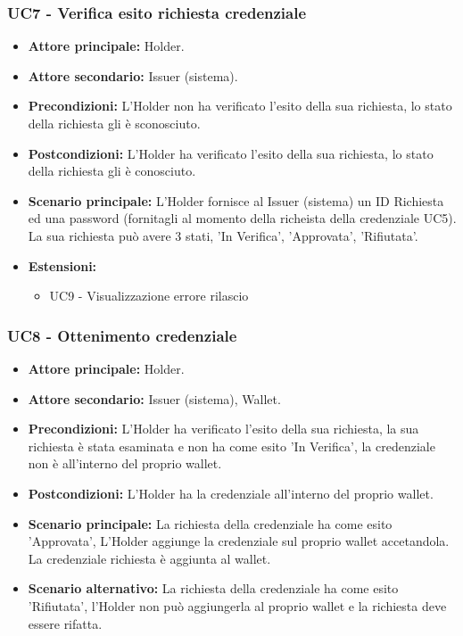 \subsubsection{UC7 - Verifica esito richiesta credenziale} 
\begin{itemize}
    \item \textbf{Attore principale:} Holder.
    \item \textbf{Attore secondario:} Issuer (sistema).
    \item \textbf{Precondizioni:} L'Holder non ha verificato l'esito della sua richiesta, lo stato della richiesta gli è sconosciuto.
    \item \textbf{Postcondizioni:} L'Holder ha verificato l'esito della sua richiesta, lo stato della richiesta gli è conosciuto.
    \item \textbf{Scenario principale:} L’Holder fornisce al Issuer (sistema) un ID Richiesta ed una password (fornitagli al momento della richeista della credenziale UC5).\\
    La sua richiesta può avere 3 stati, 'In Verifica', 'Approvata', 'Rifiutata'.
    \item \textbf{Estensioni:}
    \begin{itemize}
    \item  UC9 - Visualizzazione errore rilascio
    \end{itemize}
\end{itemize}

\subsubsection{UC8 - Ottenimento credenziale}
\begin{itemize}
    \item \textbf{Attore principale:} Holder.
    \item \textbf{Attore secondario:} Issuer (sistema), Wallet.
    \item \textbf{Precondizioni:} L'Holder ha verificato l'esito della sua richiesta, la sua richiesta è stata esaminata e non ha come esito 'In Verifica', la credenziale non è all'interno del proprio wallet.
    \item \textbf{Postcondizioni:} L'Holder ha la credenziale all'interno del proprio wallet.
    \item \textbf{Scenario principale:} La richiesta della credenziale ha come esito 'Approvata',
    L’Holder aggiunge la credenziale sul proprio wallet accetandola.\\
    La credenziale richiesta è aggiunta al wallet.
    \item \textbf{Scenario alternativo:} La richiesta della credenziale ha come esito 'Rifiutata', l'Holder non può aggiungerla al proprio wallet e la richiesta deve essere rifatta.
\end{itemize}

